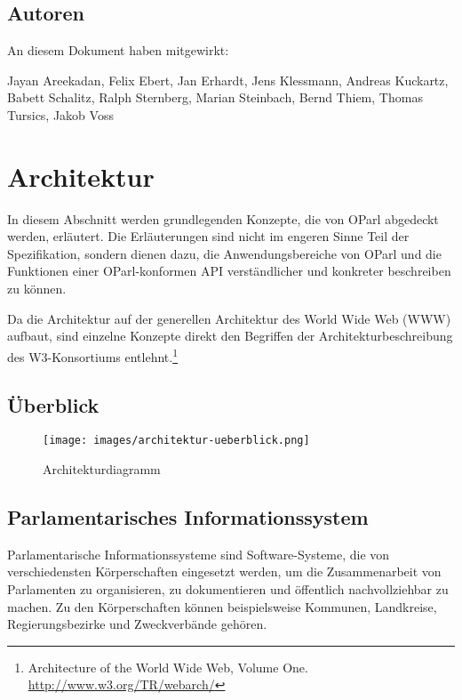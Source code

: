 \documentclass[,a4paper]{article}
\makeatletter
\def\maxwidth{\ifdim\Gin@nat@width>\linewidth\linewidth
\else\Gin@nat@width\fi}
\let\Oldincludegraphics\includegraphics
\renewcommand{\includegraphics}[1]{\Oldincludegraphics[width=\maxwidth]{#1}}
\makeatother
\begin{document}
\subsection{Autoren}\label{autoren}

An diesem Dokument haben mitgewirkt:

Jayan Areekadan, Felix Ebert, Jan Erhardt, Jens Klessmann, Andreas
Kuckartz, Babett Schalitz, Ralph Sternberg, Marian Steinbach, Bernd
Thiem, Thomas Tursics, Jakob Voss

\section{Architektur}\label{architektur}

In diesem Abschnitt werden grundlegenden Konzepte, die von OParl
abgedeckt werden, erläutert. Die Erläuterungen sind nicht im engeren
Sinne Teil der Spezifikation, sondern dienen dazu, die
Anwendungsbereiche von OParl und die Funktionen einer OParl-konformen
API verständlicher und konkreter beschreiben zu können.

Da die Architektur auf der generellen Architektur des World Wide Web
(WWW) aufbaut, sind einzelne Konzepte direkt den Begriffen der
Architekturbeschreibung des W3-Konsortiums entlehnt.\footnote{Architecture
  of the World Wide Web, Volume One. \url{http://www.w3.org/TR/webarch/}}

\subsection{Überblick}\label{uxfcberblick}

\begin{figure}[htbp]
\centering
\texttt{[image: images/architektur-ueberblick.png]}
\caption{Architekturdiagramm}
\end{figure}

\subsection{Parlamentarisches
Informationssystem}\label{parlamentarischesux5finfosystem}

Parlamentarische Informationssysteme sind Software-Systeme, die von
verschiedensten Körperschaften eingesetzt werden, um die Zusammenarbeit
von Parlamenten zu organisieren, zu dokumentieren und öffentlich
nachvollziehbar zu machen. Zu den Körperschaften können beispielsweise
Kommunen, Landkreise, Regierungsbezirke und Zweckverbände gehören.
\end{document}
